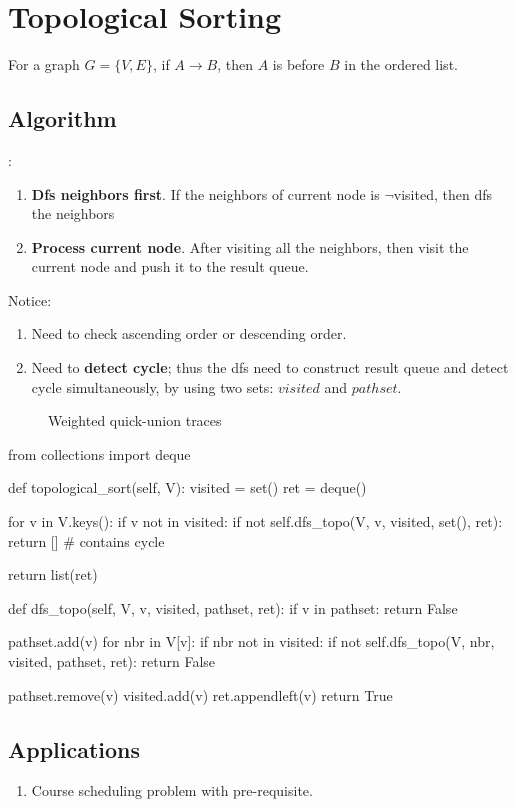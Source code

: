 \section{Topological Sorting}
For a graph $G=\{V, E\}$, if $A \rightarrow B $, then $A$ is before $B$ in the ordered list. 
\subsection{Algorithm}
:
\begin{enumerate}
\item \textbf{Dfs neighbors first}. If the neighbors of current node is  $\neg$visited, then dfs the neighbors
\item \textbf{Process current node}. After visiting all the neighbors, then visit the current node and push it to the result queue.

\end{enumerate}
Notice:
\begin{enumerate}
\item Need to check ascending order or descending order. 
\item Need to \textbf{detect cycle}; thus the dfs need to construct result queue and detect cycle simultaneously, by using two sets: $visited$ and $pathset$. 
\end{enumerate}
\begin{figure}[hbtp]
\centering
\subfloat{\texttt{[image: uf]}}
\caption{Weighted quick-union traces}
\label{fig:union_find}
\end{figure}
\begin{python}
from collections import deque

def topological_sort(self, V):
  visited = set()
  ret = deque()

  for v in V.keys():
    if v not in visited:
      if not self.dfs_topo(V, v, visited, set(), ret):
        return []  # contains cycle 

  return list(ret)

def dfs_topo(self, V, v, visited, pathset, ret):
  if v in pathset:
    return False

  pathset.add(v)
  for nbr in V[v]:
    if nbr not in visited:
      if not self.dfs_topo(V, nbr, visited, pathset, ret):
        return False

  pathset.remove(v)
  visited.add(v)
  ret.appendleft(v)
  return True

\end{python}

\subsection{Applications}
\begin{enumerate}
\item Course scheduling problem with pre-requisite. 
\end{enumerate}

